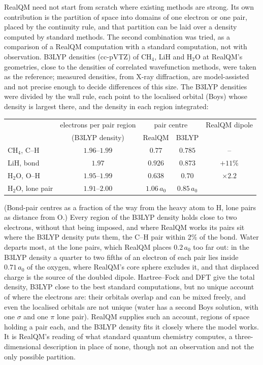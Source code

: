 RealQM need not start from scratch where existing methods are strong. Its own contribution is the partition
of space into domains of one electron or one pair, placed by the continuity rule, and that partition can be
laid over a density computed by standard methods. The second combination was tried, as a comparison of a RealQM computation with a standard computation, not with
observation. B3LYP densities (cc-pVTZ) of CH$_4$, LiH and H$_2$O at RealQM's geometries, close to the densities of
correlated wavefunction methods, were taken as the reference; measured densities, from X-ray diffraction, are
model-assisted and not precise enough to decide differences of this size. The B3LYP densities were divided by the wall rule, each point to the localised orbital (Boys) whose density is largest there, and the
density in each region integrated:
\begin{center}
\small
\begin{tabular}{lcccc}
\toprule
 & electrons per pair region & \multicolumn{2}{c}{pair centre} & RealQM dipole \\
 & (B3LYP density) & RealQM & B3LYP & \\
\midrule
CH$_4$, C--H & $1.96$--$1.99$ & $0.77$ & $0.785$ & -- \\
LiH, bond & $1.97$ & $0.926$ & $0.873$ & $+11\%$ \\
H$_2$O, O--H & $1.95$--$1.99$ & $0.638$ & $0.70$ & $\times 2.2$ \\
H$_2$O, lone pair & $1.91$--$2.00$ & $1.06\,a_0$ & $0.85\,a_0$ & \\
\bottomrule
\end{tabular}
\end{center}
(Bond-pair centres as a fraction of the way from the heavy atom to H, lone pairs as distance from O.) Every region
of the B3LYP density holds close to two electrons, without that being imposed, and where RealQM works its pairs
sit where the B3LYP density puts them, the C--H pair within $2\%$ of the bond. Water departs most, at the lone
pairs, which RealQM places $0.2\,a_0$ too far out: in the B3LYP density a quarter to two fifths of an electron of
each pair lies inside $0.71\,a_0$ of the oxygen, where RealQM's core sphere excludes it, and that displaced charge
is the source of the doubled dipole. Hartree--Fock and DFT give the total density, B3LYP close to the best standard computations, but no unique account
of where the electrons are: their orbitals overlap and can be mixed freely, and even the localised orbitals are not
unique (water has a second Boys solution, with one $\sigma$ and one $\pi$ lone pair). RealQM supplies such an account,
regions of space holding a pair each, and the B3LYP density fits it closely where the model works. It is RealQM's
reading of what standard quantum chemistry computes, a three-dimensional description in place of none, though not an
observation and not the only possible partition.

